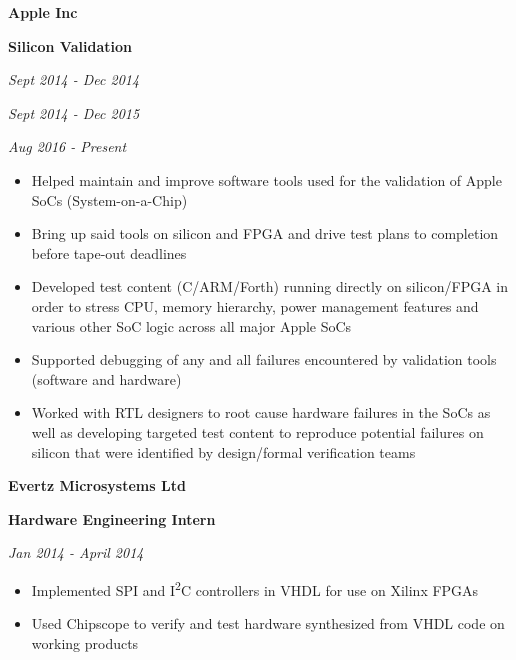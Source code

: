 \documentclass{article}
\newenvironment{name}{\fontfamily{phv}\selectfont\bfseries\normalsize}{\par}
\newenvironment{colorheading}{\fontfamily{phv}\selectfont\bfseries\normalsize\color{darkcyan}}{\par}
\newenvironment{metadata}{\fontfamily{phv}\selectfont\itshape\small\color{darkgray}}{\par}
\newenvironment{itemizedbody}{\fontfamily{phv}\selectfont\small\begin{itemize}}{\end{itemize}\par}
\newenvironment{experience}[2]%
{%
	\begin{minipage}{0.6\linewidth}\begin{flushleft}#1\end{flushleft}\end{minipage}%
	\hfill%
	\begin{minipage}{0.3\linewidth}\begin{flushright}#2\end{flushright}\end{minipage}%
}%
{}
\newcommand{\lineitem}{\item[{$\to$}]}
\begin{document}
	\begin{minipage}[t]{0.6\linewidth}
		\begin{experience}
		{
			\begin{name}Apple Inc\end{name}
  		\begin{colorheading}Silicon Validation\end{colorheading}
		}
		{
			\begin{metadata}Sept 2014 - Dec 2014\end{metadata}
			\begin{metadata}Sept 2014 - Dec 2015\end{metadata}
			\begin{metadata}Aug 2016 - Present\end{metadata}
		}
		\end{experience}
  	\begin{itemizedbody}
  	  \lineitem Helped maintain and improve software tools used for the validation of Apple SoCs (System-on-a-Chip)
  	  \lineitem Bring up said tools on silicon and FPGA and drive test plans to completion before tape-out deadlines
  	  \lineitem Developed test content (C/ARM/Forth) running directly on silicon/FPGA in order to stress CPU,
							  memory hierarchy, power management features and various other SoC logic across all major Apple SoCs
  	  \lineitem Supported debugging of any and all failures encountered by validation tools (software and hardware)
  	  \lineitem Worked with RTL designers to root cause hardware failures in the SoCs as well as developing targeted
								test content to reproduce potential failures on silicon that were identified by design/formal
								verification teams
  	\end{itemizedbody}
		\smallskip
  	\begin{experience}
		{
  	  \begin{name}Evertz Microsystems Ltd\end{name}
  	  \begin{colorheading}Hardware Engineering Intern\end{colorheading}
		}
		{
  	  \begin{metadata}Jan 2014 - April 2014\end{metadata}
		}
		\end{experience}
		\begin{itemizedbody}
			\lineitem Implemented SPI and I\textsuperscript{2}C controllers in VHDL for use on Xilinx FPGAs
			\lineitem Used Chipscope to verify and test hardware synthesized from VHDL code on working products

\end{itemizedbody}
\end{minipage}
\end{document}
